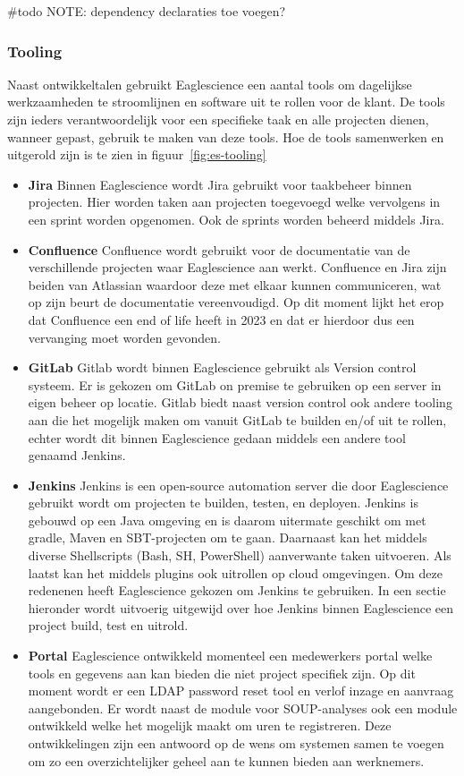 \begin{itemize}
\end{itemize}

#todo NOTE: dependency declaraties toe voegen?

\subsubsection{Tooling}\label{subsubsec:tooling}
Naast ontwikkeltalen gebruikt Eaglescience een aantal tools om dagelijkse werkzaamheden te stroomlijnen en software uit te rollen voor de klant. De tools zijn ieders verantwoordelijk voor een specifieke taak en alle projecten dienen, wanneer gepast, gebruik te maken van deze tools. Hoe de tools samenwerken en uitgerold zijn is te zien in figuur~\ref{fig:es-tooling}

\begin{itemize}
    \item \textbf{Jira}
    Binnen Eaglescience wordt Jira gebruikt voor taakbeheer binnen projecten. Hier worden taken aan projecten toegevoegd welke vervolgens in een sprint worden opgenomen. Ook de sprints worden beheerd middels Jira.
    \item \textbf{Confluence}
    Confluence wordt gebruikt voor de documentatie van de verschillende projecten waar Eaglescience aan werkt. Confluence en Jira zijn beiden van Atlassian waardoor deze met elkaar kunnen communiceren, wat op zijn beurt de documentatie vereenvoudigd. Op dit moment lijkt het erop dat Confluence een end of life heeft in 2023 en dat er hierdoor dus een vervanging moet worden gevonden.
    \item \textbf{GitLab}
    Gitlab wordt binnen Eaglescience gebruikt als Version control systeem. Er is gekozen om GitLab on premise te gebruiken op een server in eigen beheer op locatie. Gitlab biedt naast version control ook andere tooling aan die het mogelijk maken om vanuit GitLab te builden en/of uit te rollen, echter wordt dit binnen Eaglescience gedaan middels een andere tool genaamd Jenkins.
    \item \textbf{Jenkins}
    Jenkins is een open-source automation server die door Eaglescience gebruikt wordt om projecten te builden, testen, en deployen. Jenkins is gebouwd op een Java omgeving en is daarom uitermate geschikt om met gradle, Maven en SBT-projecten om te gaan. Daarnaast kan het middels diverse Shellscripts (Bash, SH, PowerShell) aanverwante taken uitvoeren. Als laatst kan het middels plugins ook uitrollen op cloud omgevingen. Om deze redenenen heeft Eaglescience gekozen om Jenkins te gebruiken. In een sectie hieronder wordt uitvoerig uitgewijd over hoe Jenkins binnen Eaglescience een project build, test en uitrold.
    \item \textbf{Portal}
    Eaglescience ontwikkeld momenteel een medewerkers portal welke tools en gegevens aan kan bieden die niet project specifiek zijn. Op dit moment wordt er een LDAP password reset tool en verlof inzage en aanvraag aangebonden. Er wordt naast de module voor SOUP-analyses ook een module ontwikkeld welke het mogelijk maakt om uren te registreren. Deze ontwikkelingen zijn een antwoord op de wens om systemen samen te voegen om zo een overzichtelijker geheel aan te kunnen bieden aan werknemers.


\end{itemize}
